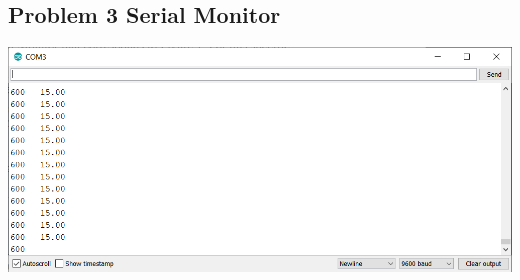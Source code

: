 \documentclass{article}
\begin{document}
\begin{center}
\section*{Problem 3 Serial Monitor}
\includegraphics[scale=.7]{p3serialmonitorcapture.png}
\end{center}
\end{document}
